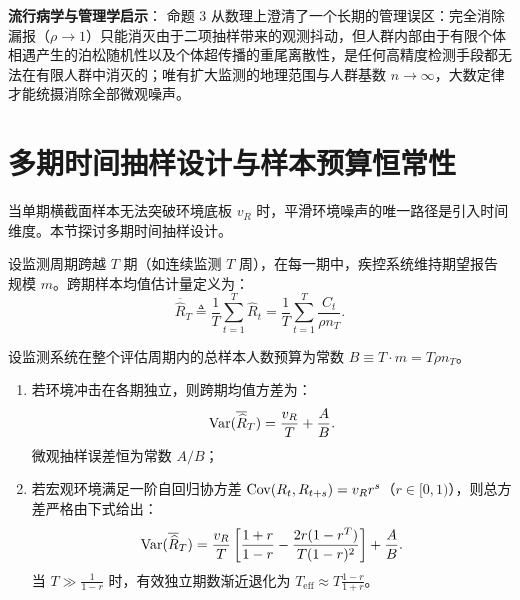\noindent\textbf{流行病学与管理学启示}：
命题 3 从数理上澄清了一个长期的管理误区：完全消除漏报（$\rho \to 1$）只能消灭由于二项抽样带来的观测抖动，但人群内部由于有限个体相遇产生的泊松随机性以及个体超传播的重尾离散性，是任何高精度检测手段都无法在有限人群中消灭的；唯有扩大监测的地理范围与人群基数 $n \to \infty$，大数定律才能统摄消除全部微观噪声。

\section{多期时间抽样设计与样本预算恒常性}\label{sec:prop4}

当单期横截面样本无法突破环境底板 $v_R$ 时，平滑环境噪声的唯一路径是引入时间维度。本节探讨多期时间抽样设计。

设监测周期跨越 $T$ 期（如连续监测 $T$ 周），在每一期中，疾控系统维持期望报告规模 $m$。跨期样本均值估计量定义为：
\begin{equation}
\overline{\widehat{R}}_T \triangleq \frac{1}{T} \sum_{t=1}^T \widehat{R}_t = \frac{1}{T} \sum_{t=1}^T \frac{C_t}{\rho n_T}.
\end{equation}

\begin{proposition}\label{prop:prop4}
设监测系统在整个评估周期内的总样本人数预算为常数 $B \equiv T \cdot m = T \rho n_T$。
\begin{enumerate}[label=(\roman*)]
    \item 若环境冲击在各期独立，则跨期均值方差为：
    \begin{equation}
    \operatorname{Var}(\overline{\widehat{R}}_T) = \frac{v_R}{T} + \frac{A}{B}. \label{eq:budget_constant_var}
    \end{equation}
    微观抽样误差恒为常数 $A/B$；
    \item 若宏观环境满足一阶自回归协方差 $\operatorname{Cov}(R_t, R_{t+s}) = v_R r^s$（$r \in [0, 1)$），则总方差严格由下式给出：
    \begin{equation}
    \operatorname{Var}(\overline{\widehat{R}}_T) = \frac{v_R}{T}\left[ \frac{1+r}{1-r} - \frac{2r(1-r^T)}{T(1-r)^2} \right] + \frac{A}{B}. \label{eq:ar1_closed_form}
    \end{equation}
    当 $T \gg \frac{1}{1-r}$ 时，有效独立期数渐近退化为 $T_{\mathrm{eff}} \approx T \frac{1-r}{1+r}$。
\end{enumerate}
\end{proposition}

